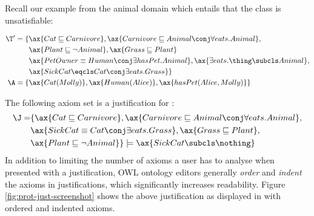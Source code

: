 Recall our example from the animal domain which entails that the class  is  unsatisfiable:
\begin{examp}
\begin{align*}
		\T' = \{&\ax{Cat \sqsubseteq Carnivore}, \ax{Carnivore \sqsubseteq Animal \conj \forall eats.Animal},\\ 
		& \ax{Plant \sqsubseteq \lnot Animal}, \ax{Grass \sqsubseteq Plant} \\ 
		& \ax{PetOwner \equiv Human\conj \exists hasPet.Animal}, \ax{\exists eats.\thing \subcls Animal}, \\
		& \ax{SickCat \eqcls Cat \conj \exists eats.Grass}\}\\
		\A = \{& \ax{Cat(Molly)},\ax{Human(Alice)},\ax{hasPet(Alice, Molly)}\}
	\end{align*}
\end{examp}
The following axiom set is a justification for : 
\begin{align*}
\J = & \{ \ax{Cat \sqsubseteq Carnivore},\ax{Carnivore \sqsubseteq Animal \conj \forall eats.Animal}, \\
&\ax{SickCat \equiv Cat \conj \exists eats.Grass}, \ax{Grass \sqsubseteq Plant}, \\
&\ax{Plant \sqsubseteq \lnot Animal} \} \models \ax{SickCat \subcls \nothing}
\end{align*}
In addition to limiting the number of axioms a user has to analyse when presented with a justification, OWL ontology editors generally \emph{order} and \emph{indent} the axioms in justifications, which significantly increases readability. Figure \ref{fig:prot-just-screenshot} shows the above justification as displayed in \protege with ordered and indented axioms.
\begin{figure}
\end{figure}

